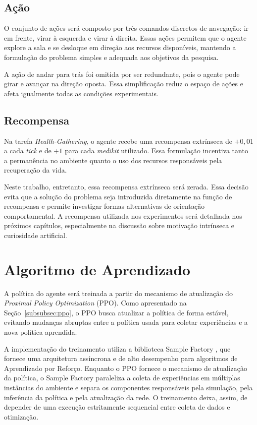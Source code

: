\subsection{Ação}

O conjunto de ações será composto por três comandos discretos de navegação: ir em frente, virar à esquerda e virar à direita. Essas ações permitem que o agente explore a sala e se desloque em direção aos recursos disponíveis, mantendo a formulação do problema simples e adequada aos objetivos da pesquisa.

A ação de andar para trás foi omitida por ser redundante, pois o agente pode girar e avançar na direção oposta. Essa simplificação reduz o espaço de ações e afeta igualmente todas as condições experimentais.


\subsection{Recompensa}

Na tarefa \textit{Health-Gathering}, o agente recebe uma recompensa extrínseca de $+0{,}01$ a cada \textit{tick} e de $+1$ para cada \textit{medikit} utilizado. Essa formulação incentiva tanto a permanência no ambiente quanto o uso dos recursos responsáveis pela recuperação da vida.

Neste trabalho, entretanto, essa recompensa extrínseca será zerada. Essa decisão evita que a solução do problema seja introduzida diretamente na função de recompensa e permite investigar formas alternativas de orientação comportamental. A recompensa utilizada nos experimentos será detalhada nos próximos capítulos, especialmente na discussão sobre motivação intrínseca e curiosidade artificial.


\section{Algoritmo de Aprendizado}

A política do agente será treinada a partir do mecanismo de atualização do \textit{Proximal Policy Optimization} (PPO). Como apresentado na Seção~\ref{subsubsec:ppo}, o PPO busca atualizar a política de forma estável, evitando mudanças abruptas entre a política usada para coletar experiências e a nova política aprendida.

A implementação do treinamento utiliza a biblioteca Sample Factory \cite{sample_factory}, que fornece uma arquitetura assíncrona e de alto desempenho para algoritmos de Aprendizado por Reforço. Enquanto o PPO fornece o mecanismo de atualização da política, o Sample Factory paraleliza a coleta de experiências em múltiplas instâncias do ambiente e separa os componentes responsáveis pela simulação, pela inferência da política e pela atualização da rede. O treinamento deixa, assim, de depender de uma execução estritamente sequencial entre coleta de dados e otimização.

